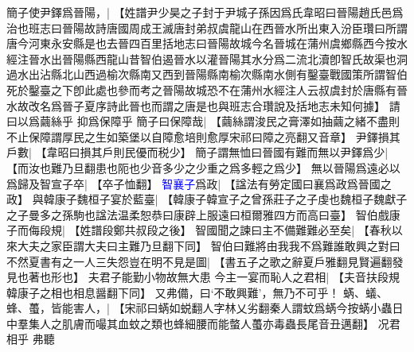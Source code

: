 簡子使尹鐸爲晉陽，|{
	【姓譜尹少昊之子封于尹城子孫因爲氏韋昭曰晉陽趙氏邑爲治也班志曰晉陽故詩唐國周成王滅唐封弟叔虞龍山在西晉水所出東入汾臣瓚曰所謂唐今河東永安縣是也去晉四百里括地志曰晉陽故城今名晉城在蒲州虞鄉縣西今按水經注晉水出晉陽縣西龍山昔智伯遏晉水以灌晉陽其水分爲二流北瀆卽智氏故渠也洞過水出沾縣北山西過榆次縣南又西到晉陽縣南榆次縣南水側有鑿臺戰國策所謂智伯死於鑿臺之下卽此處也參而考之晉陽故城恐不在蒲州水經注人云叔虞封於唐縣有晉水故改名爲晉子夏序詩此晉也而謂之唐是也與班志合瓚說及括地志未知何據】}
請曰以爲繭絲乎
抑爲保障乎
簡子曰保障哉|{
	【繭絲謂浚民之膏澤如抽繭之緒不盡則不止保障謂厚民之生如築堡以自障愈培則愈厚宋祁曰障之亮翻又音章】}
尹鐸損其戶數|{
	【韋昭曰損其戶則民優而税少】}
簡子謂無恤曰晉國有難而無以尹鐸爲少|{
	【而汝也難乃旦翻患也阨也少音多少之少重之爲多輕之爲少】}
無以晉陽爲遠必以爲歸及智宣子卒|{
	【卒子恤翻】}
\textcolor{blue}{智襄子}爲政|{
	【諡法有勞定國曰襄爲政爲晉國之政】}
與韓康子魏桓子宴於藍臺|{
	【韓康子韓宣子之曾孫莊子之子虔也魏桓子魏獻子之子曼多之孫駒也諡法温柔恕恭曰康辟上服遠曰桓爾雅四方而高曰臺】}
智伯戲康子而侮段規|{
	【姓譜段鄭共叔段之後】}
智國聞之諫曰主不備難難必至矣|{
	【春秋以來大夫之家臣謂大夫曰主難乃旦翻下同】}
智伯曰難將由我我不爲難誰敢興之對曰不然夏書有之一人三失怨豈在明不見是圖|{
	【書五子之歌之辭夏戶雅翻見賢遍翻發見也著也形也】}
夫君子能勤小物故無大患
今主一宴而恥人之君相|{
	【夫音扶段規韓康子之相也相息醤翻下同】}
又弗備，曰‘不敢興難’，無乃不可乎！
蜹、蟻、蜂、蠆，皆能害人，|{
	【宋祁曰蜹如蜕翻人字林乂劣翻秦人謂蚊爲蜹今按蜹小蟲日中羣集人之肌膚而嘬其血蚊之類也蜂細腰而能螫人蠆亦毒蟲長尾音丑邁翻】
	}
况君相乎
弗聽


